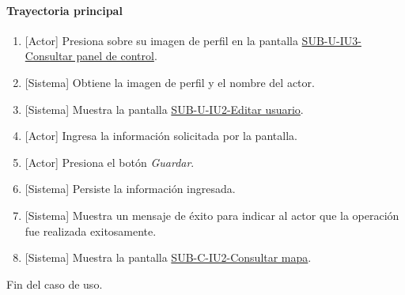 \paragraph{Trayectoria principal}
	\begin{enumerate}
		\item {[Actor]} Presiona sobre su imagen de perfil en la pantalla \hyperref[fig:sub-u-iu3]{SUB-U-IU3-Consultar panel de control}.
		\item {[Sistema]} Obtiene la imagen de perfil y el nombre del actor.
		\item {[Sistema]} Muestra la pantalla \hyperref[fig:sub-u-iu2]{SUB-U-IU2-Editar usuario}.
		\item {[Actor]} Ingresa la información solicitada por la pantalla.
		\item {[Actor]} Presiona el botón \textit{Guardar}.
		\item {[Sistema]} Persiste la información ingresada.
		\item {[Sistema]} Muestra un mensaje de éxito para indicar al actor que la operación fue realizada exitosamente.
		\item \label{SUB-U-CU1:Pantalla} {[Sistema]} Muestra la pantalla \hyperref[fig:sub-c-iu2]{SUB-C-IU2-Consultar mapa}.
	\end{enumerate}
	Fin del caso de uso.

